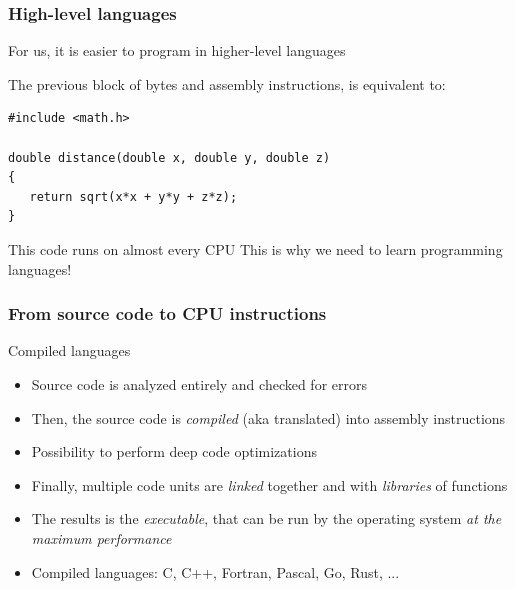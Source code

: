 \documentclass[handout]{beamer}
\begin{document}
\begin{frame}[fragile]
  \frametitle{High-level languages}
  \begin{block}{}
  For us, it is easier to program in higher-level languages
  \end{block}
  \vspace{1cm}
  The previous block of bytes and assembly instructions, is
  equivalent to:
  \begin{lstlisting}
#include <math.h>

double distance(double x, double y, double z)
{
   return sqrt(x*x + y*y + z*z);
}
  \end{lstlisting}\pause
  \begin{block}{This code runs on almost every CPU}
  This is why we need to learn programming languages!
  \end{block}
\end{frame}

\begin{frame}[fragile]
  \frametitle{From source code to CPU instructions}
  \begin{block}{Compiled languages}
  \begin{itemize}
  \item Source code is analyzed entirely and checked for errors\pause
  \item Then, the source code is \emph{compiled} (aka translated) into assembly instructions\pause
  \item Possibility to perform deep code optimizations\pause
  \item Finally, multiple code units are \emph{linked} together and with
        \emph{libraries} of functions\pause
  \item The results is the \emph{executable}, that can be run by the operating system
        \emph{at the maximum performance}\pause
  \item Compiled languages: C, C++, Fortran, Pascal, Go, Rust, ...
  \end{itemize}
  \end{block}
\end{frame}
\end{document}
